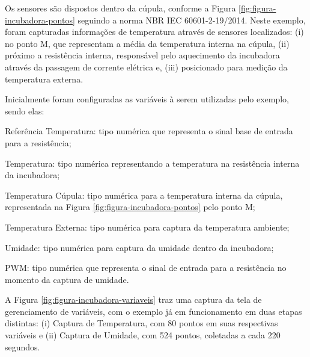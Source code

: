 Os sensores são dispostos dentro da cúpula, conforme a Figura \ref{fig:figura-incubadora-pontos} seguindo a norma NBR IEC 60601-2-19/2014. Neste exemplo, foram capturadas informações de temperatura através de sensores localizados: (i) no ponto M, que representam a média da temperatura interna na cúpula, (ii) próximo a resistência interna, responsável pelo aquecimento da incubadora através da passagem de corrente elétrica  e, (iii) posicionado para medição da temperatura externa.
    	
        \begin{figure}[!h]
    	\end{figure}
    	
Inicialmente foram configuradas as variáveis à serem utilizadas pelo exemplo, sendo elas:
\begin{alineascomponto}
    \item Referência Temperatura: tipo numérica que representa o sinal base de entrada para a resistência;
    \item Temperatura: tipo numérica representando a temperatura na resistência interna da incubadora;
    \item Temperatura Cúpula: tipo numérica para a temperatura interna da cúpula, representada na Figura \ref{fig:figura-incubadora-pontos} pelo ponto M;
    \item Temperatura Externa: tipo numérica para captura da temperatura ambiente;
    \item Umidade: tipo numérica para captura da umidade dentro da incubadora;
    \item PWM: tipo numérica que representa o sinal de entrada para a resistência no momento da captura de umidade.
\end{alineascomponto}

A Figura \ref{fig:figura-incubadora-variaveis} traz uma captura da tela de gerenciamento de variáveis, com o exemplo já em funcionamento em duas etapas distintas: (i) Captura de Temperatura, com 80 pontos em suas respectivas variáveis e (ii) Captura de Umidade, com 524 pontos, coletadas a cada 220 segundos.
    	
